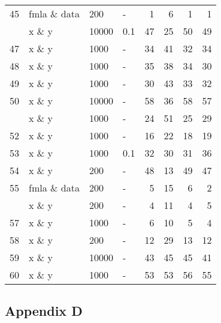 \begin{Schunk}
\begin{table}
\begin{tabular}[t]{rlllrrrr}
45 & fmla \& data & 200 & - & 1 & 6 & 1 & 1\\
\addlinespace
46 & x \& y & 10000 & 0.1 & 47 & 25 & 50 & 49\\
47 & x \& y & 1000 & - & 34 & 41 & 32 & 34\\
48 & x \& y & 1000 & - & 35 & 38 & 34 & 30\\
49 & x \& y & 1000 & - & 30 & 43 & 33 & 32\\
50 & x \& y & 10000 & - & 58 & 36 & 58 & 57\\
\addlinespace
51 & x \& y & 1000 & - & 24 & 51 & 25 & 29\\
52 & x \& y & 1000 & - & 16 & 22 & 18 & 19\\
53 & x \& y & 1000 & 0.1 & 32 & 30 & 31 & 36\\
54 & x \& y & 200 & - & 48 & 13 & 49 & 47\\
55 & fmla \& data & 200 & - & 5 & 15 & 6 & 2\\
\addlinespace
56 & x \& y & 200 & - & 4 & 11 & 4 & 5\\
57 & x \& y & 1000 & - & 6 & 10 & 5 & 4\\
58 & x \& y & 200 & - & 12 & 29 & 13 & 12\\
59 & x \& y & 10000 & - & 43 & 45 & 45 & 41\\
60 & x \& y & 1000 & - & 53 & 53 & 56 & 55\\
\bottomrule
\end{tabular}
\end{table}

\end{Schunk}

\hypertarget{appendix-d}{%
\subsection{Appendix D}\label{appendix-d}}

